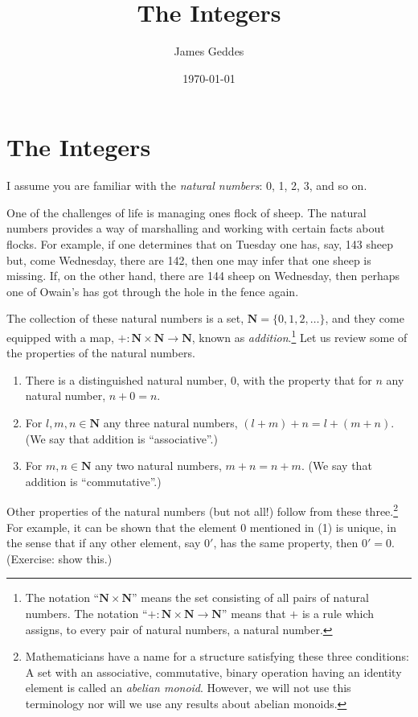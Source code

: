 \documentclass[10pt, a4paper, twocolumn]{article}
\author{James Geddes}
\date{\today}
\title{The Integers}
\newcommand{\N}{\mathbold{N}}
\begin{document}
\section*{The Integers}

I assume you are familiar with the \emph{natural numbers}: 0, 1, 2, 3,
and so on.

One of the challenges of life is managing ones flock of sheep. The
natural numbers provides a way of marshalling and working with certain
facts about flocks. For example, if one determines that on Tuesday one
has, say, 143 sheep but, come Wednesday, there are 142, then one may
infer that one sheep is missing. If, on the other hand, there are 144
sheep on Wednesday, then perhaps one of Owain's has got through the
hole in the fence again.

The collection of these natural numbers is a set,
$\N=\{0,1,2,\dotsc\}$, and they come equipped with a map,
$+:\N\times\N\to\N$, known as \emph{addition}.\footnote{The notation
``$\N\times\N$'' means the set consisting of all pairs of natural
numbers. The notation ``$+:\N\times\N\to\N$'' means that $+$ is a rule
which assigns, to every pair of natural numbers, a natural number.}
Let us review some of the properties of the natural numbers.
\begin{enumerate}
\item There is a distinguished natural number, $0$, with the
  property that for $n$ any natural number, $n+0=n$.
\item For $l,m,n\in\N$ any three natural numbers, $(l+m)+n=l+(m+n)$. (We say
  that addition is ``associative''.)
\item For $m,n\in\N$ any two natural numbers, $m+n=n+m$. (We say that
  addition is ``commutative''.)
\end{enumerate}
Other properties of the natural numbers (but not all!) follow from
these three.\footnote{Mathematicians have a name for a structure
satisfying these three conditions: A set with an associative,
commutative, binary operation having an identity element is called an
\emph{abelian monoid}. However, we will not use this terminology nor
will we use any results about abelian monoids.} For example,
it can be shown that the element $0$ mentioned in (1) is unique, in
the sense that if any other element, say $0'$, has the same property,
then $0'=0$. (Exercise: show this.)
\end{document}
